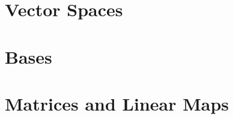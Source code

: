 \documentclass[british,11pt,a4paper]{report}
\begin{document}
\maketitle
\tableofcontents

\chapter{Vector Spaces}

\chapter{Bases}

\chapter{Matrices and Linear Maps}

\end{document}
